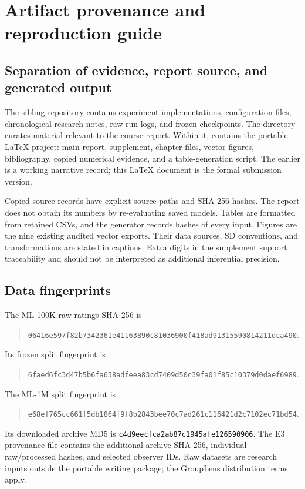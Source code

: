 \section{Artifact provenance and reproduction guide}
\label{app:repro}
\subsection{Separation of evidence, report source, and generated output}
The sibling  repository contains experiment implementations,
configuration files, chronological research notes, raw run logs, and frozen
checkpoints. The  directory curates material relevant to the
course report. Within it,  contains the portable LaTeX
project: main report, supplement, chapter files, vector figures, bibliography,
copied numerical evidence, and a table-generation script. The earlier
 is a working narrative record; this
LaTeX document is the formal submission version.

Copied source records have explicit source paths and SHA-256 hashes. The
report does not obtain its numbers by re-evaluating saved models. Tables
are formatted from retained CSVs, and the generator records hashes of
every input. Figures are the nine existing audited vector exports. Their
data sources, SD conventions, and transformations are stated in captions.
Extra digits in the supplement support traceability and should not be
interpreted as additional inferential precision.

\subsection{Data fingerprints}
The ML-100K raw ratings SHA-256 is
\begin{quote}\small\nolinkurl{06416e597f82b7342361e41163890c81036900f418ad91315590814211dca490}.\end{quote}
Its frozen split fingerprint is
\begin{quote}\small\nolinkurl{6faed6fc3d47b5b6fa638adfeea83cd7409d50c39fa01f85c10379d0daef6989}.\end{quote}
The ML-1M split fingerprint is
\begin{quote}\small\nolinkurl{e68ef765cc661f5db1864f9f8b2843bee70c7ad261c116421d2c7102ec71bd54}.\end{quote}
Its downloaded archive MD5 is
\nolinkurl{c4d9eecfca2ab87c1945afe126590906}. The E3 provenance file
contains the additional archive SHA-256, individual raw/processed hashes,
and selected observer IDs. Raw datasets are research inputs outside the
portable writing package; the GroupLens distribution terms apply.

